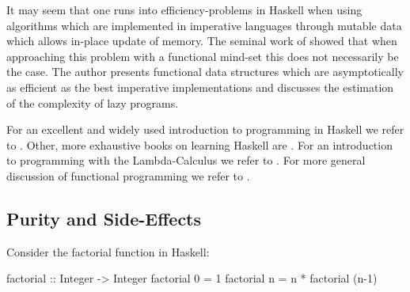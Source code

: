 It may seem that one runs into efficiency-problems in Haskell when using algorithms which are implemented in imperative languages through mutable data which allows in-place update of memory. The seminal work of \cite{okasaki_purely_1999} showed that when approaching this problem with a functional mind-set this does not necessarily be the case. The author presents functional data structures which are asymptotically as efficient as the best imperative implementations and discusses the estimation of the complexity of lazy programs.

For an excellent and widely used introduction to programming in Haskell we refer to \cite{hutton_programming_2016}. Other, more exhaustive books on learning Haskell are \cite{lipovaca_learn_2011,allen_haskell_2016}. For an introduction to programming with the Lambda-Calculus we refer to \cite{michaelson_introduction_2011}. For more general discussion of functional programming we refer to \cite{hughes_why_1989,maclennan_functional_1990,hudak_history_2007}.

\subsection{Purity and Side-Effects}
Consider the factorial function in Haskell:
\begin{HaskellCode}
factorial :: Integer -> Integer
factorial 0 = 1
factorial n = n * factorial (n-1)
\end{HaskellCode}

